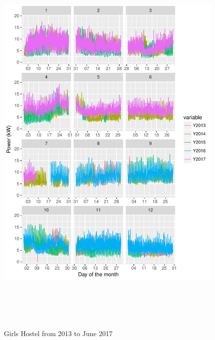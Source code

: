 \documentclass[11pt, oneside]{article}   	%
\begin{document}
\begin{figure}
\includegraphics[width=30cm,height=20cm,keepaspectratio]{girls_hostel.pdf}
\caption{Girls Hostel from 2013 to June 2017}
\end{figure}
\end{document}

